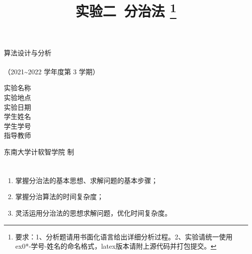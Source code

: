 \documentclass[12pt,a4paper]{ctexart}
\begin{document}
    \begin{titlepage}
        \heiti
        \vspace*{64pt}
        \begin{center}
            \fontsize{48pt}{0} 算法设计与分析\\
            \vspace*{36pt}
            \\
            \vspace*{48pt}
            \LARGE（2021\~{}2022 学年度\qquad 第 3 学期）\\
            \vspace*{48pt}
        
            \LARGE 实验名称\ \ \underline{\makebox[200pt]{\ExamTitle}}\\
            \LARGE 实验地点\ \ \underline{\makebox[200pt]{\ExamAddr}}\\
            \LARGE 实验日期\ \ \underline{\makebox[200pt]{\today}}\\
            \LARGE 学生姓名\ \ \underline{\makebox[200pt]{\MyName}}\\
            \LARGE 学生学号\ \ \underline{\makebox[200pt]{\MySID}}\\
            \LARGE 指导教师\ \ \underline{\makebox[200pt]{\TeacherName}}\\
            \vspace*{48pt}
            
            \LARGE 东南大学\quad  计软智学院 \quad 制
        \end{center}
    \end{titlepage}

\title{
  {\heiti \textbf{实验二\ 分治法}
    \footnote{要求：1、分析题请用书面化语言给出详细分析过程。2、实验请统一使用ex0*-学号-姓名的命名格式，latex版本请附上源代码并打包提交。}
    }
}
\date{}

\maketitle

\section*{\bf \color{black}{一、实验目的及意义}}
\noindent
\begin{enumerate}
	\item[(1)]  掌握分治法的基本思想、求解问题的基本步骤；
	\item[(2)]  掌握分治算法的时间复杂度；
	\item[(3)]  灵活运用分治法的思想求解问题，优化时间复杂度。
\end{enumerate}
\end{document}
